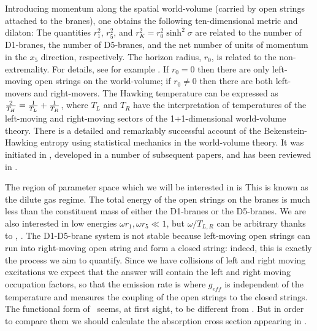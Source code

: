 Introducing momentum along the spatial world-volume (carried by open
strings attached to the branes), one obtains the following ten-dimensional
metric and dilaton:
 The quantities $r_1^2$, $r_5^2$, and $r_K^2 = r_0^2 \sinh^2\sigma$ are
related to the number of D1-branes, the number of D5-branes, and the net
number of units of momentum in the $x_5$ direction, respectively.  The
horizon radius, $r_0$, is related to the non-extremality.  For details, see
for example \cite{Maldacena:1997ix}.  If $r_0 = 0$ then there are only
left-moving open strings on the world-volume; if $r_0 \neq 0$ then there
are both left-movers and right-movers.  The Hawking temperature can be
expressed as ${2 \over T_H} = {1 \over T_L} + {1 \over T_R}$, where
 $T_L$ and $T_R$ have the interpretation of temperatures of the left-moving
and right-moving sectors of the 1+1-dimensional world-volume theory.  There
is a detailed and remarkably successful account of the Bekenstein-Hawking
entropy using statistical mechanics in the world-volume theory.  It was
initiated in \cite{Strominger:1996sh}, developed in a number of subsequent
papers, and has been reviewed in \cite{Peet:1997es}.

The region of parameter space which we will be interested in is
 This is known as the dilute gas regime.  The total energy of the open
strings on the branes is much less than the constituent mass of either the
D1-branes or the D5-branes.
 We are also interested in low energies
$\omega r_1, \omega r_5 \ll 1$, but $\omega/T_{L,R}$ can be arbitrary
thanks to \DiluteGas , \TLR . 
  The D1-D5-brane system is not stable because
left-moving open strings
   can run into right-moving open string and form a
closed string: indeed, this is exactly the process we aim to quantify.
Since we have collisions of left and right moving excitations we
expect that the answer will contain the left and right moving occupation
factors, so that the emission rate is 
where $g_{eff}$ is independent of the temperature and measures the 
coupling of the open strings to the closed strings. 
The functional form of \emission\ seems, at first sight,
 to be different from \HawkingRadiation . But 
in order to compare them we should calculate 
the absorption cross section
appearing in \HawkingRadiation .

